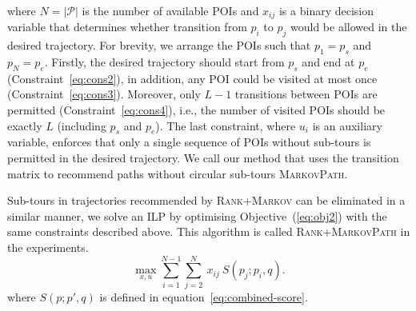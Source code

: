 where $N=|\mathcal{P}|$ is the number of available POIs and $x_{ij}$ is a binary decision variable
that determines whether transition from $p_i$ to $p_j$ would be allowed in the desired trajectory.
For brevity, we arrange the POIs such that $p_1 = p_s$ and $p_N = p_e$.
Firstly, the desired trajectory should start from $p_s$ and end at $p_e$ (Constraint~\ref{eq:cons2}),
in addition, any POI could be visited at most once (Constraint~\ref{eq:cons3}).
Moreover, only $L-1$ transitions between POIs are permitted (Constraint~\ref{eq:cons4}),
i.e., the number of visited POIs should be exactly $L$ (including $p_s$ and $p_e$).
The last constraint, where $u_i$ is an auxiliary variable,
enforces that only a single sequence of POIs without sub-tours is permitted in the desired trajectory.
We call our method that uses the transition matrix to recommend paths
without circular sub-tours \textsc{MarkovPath}.


Sub-tours in trajectories recommended by \textsc{Rank+Markov} can be eliminated in a similar manner,
we solve an ILP by optimising Objective~(\ref{eq:obj2}) with the same constraints described above.
This algorithm is called \textsc{Rank+MarkovPath} in the experiments.
\eqmoveup
\eqmoveup
\eqmoveup
\begin{equation}
\label{eq:obj2}
\max_{x,u} \sum_{i=1}^{N-1} \sum_{j=2}^N ~x_{ij} ~S(p_j; p_i, q).
\end{equation}
where $S(p;p',q)$ is defined in equation~\ref{eq:combined-score}.



